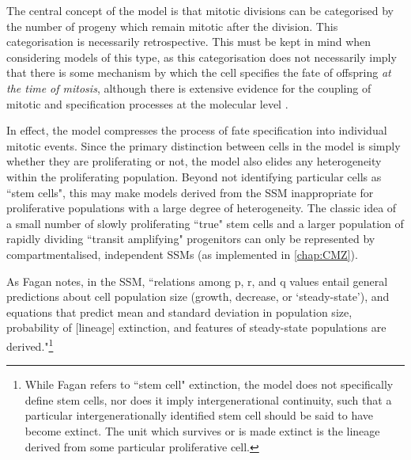 The central concept of the model is that mitotic divisions can be categorised by the number of progeny which remain mitotic after the division. This categorisation is necessarily retrospective. This must be kept in mind when considering models of this type, as this categorisation does not necessarily imply that there is some mechanism by which the cell specifies the fate of offspring \textit{at the time of mitosis}, although there is extensive evidence for the coupling of mitotic and specification processes at the molecular level \cite{Tran2013,Tee2014,Dalton2015,Deschamps2017}.

In effect, the model compresses the process of fate specification into individual mitotic events. Since the primary distinction between cells in the model is simply whether they are proliferating or not, the model also elides any heterogeneity within the proliferating population. Beyond not identifying particular cells as ``stem cells", this may make models derived from the SSM inappropriate for proliferative populations with a large degree of heterogeneity. The classic idea of a small number of slowly proliferating ``true" stem cells and a larger population of rapidly dividing ``transit amplifying" progenitors can only be represented by compartmentalised, independent SSMs (as implemented in \autoref{chap:CMZ}).

As Fagan notes, in the SSM, ``relations among p, r, and q values entail general predictions about cell population size (growth, decrease, or ‘steady-state’), and equations that predict mean and standard deviation in population size, probability of [lineage] extinction, and features of steady-state populations are derived."\footnote{While Fagan refers to ``stem cell" extinction, the model does not specifically define stem cells, nor does it imply intergenerational continuity, such that a particular intergenerationally identified stem cell should be said to have become extinct. The unit which survives or is made extinct is the lineage derived from some particular proliferative cell.} \cite[p.60]{Fagan2013}

